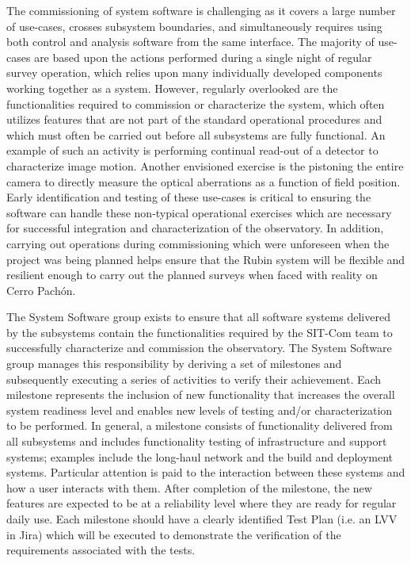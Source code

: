 \documentclass[SE,toc]{lsstdoc}
\begin{document}
The commissioning of system software is challenging as it covers a large number of use-cases, crosses subsystem boundaries, and simultaneously requires using both control and analysis software from the same interface.
The majority of use-cases are based upon the actions performed during a single night of regular survey operation, which relies upon many individually developed components working together as a system.
However, regularly overlooked are the functionalities required to commission or characterize the system, which often utilizes features that are not part of the standard operational procedures and which must often be carried out before all subsystems are fully functional.
An example of such an activity is performing continual read-out of a detector to characterize image motion.
Another envisioned exercise is the pistoning the entire camera to directly measure the optical aberrations as a function of field position.
Early identification and testing of these use-cases is critical to ensuring the software can handle these non-typical operational exercises which are necessary for successful integration and characterization of the observatory.
In addition, carrying out operations during commissioning which were unforeseen when the project was being planned helps ensure that the Rubin system will be flexible and resilient enough to carry out the planned surveys when faced with reality on Cerro Pachón.

The System Software group exists to ensure that all software systems delivered by the subsystems contain the functionalities required by the SIT-Com team to successfully characterize and commission the observatory.
The System Software group manages this responsibility by deriving a set of milestones and subsequently executing a series of activities to verify their achievement. Each milestone represents the inclusion of new functionality that increases the overall system readiness level and enables new levels of testing and/or characterization to be performed.
In general, a milestone consists of functionality delivered from all subsystems and includes functionality testing of infrastructure and support systems; examples include the long-haul network and the build and deployment systems.
Particular attention is paid to the interaction between these systems and how a user interacts with them.
After completion of the milestone, the new features are expected to be at a reliability level where they are ready for regular daily use.
Each milestone should have a clearly identified Test Plan (i.e. an LVV in Jira) which will be executed to demonstrate the verification of the requirements associated with the tests.
\end{document}
